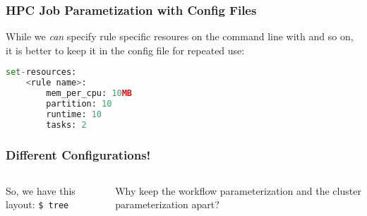 \begin{frame}[fragile]
  \frametitle{HPC Job Parametization with Config Files}
  While we \emph{can} specify rule specific resoures on the command line with  and so on, it is better to keep it in the config file for repeated use:
  \begin{lstlisting}[language=Python,style=Python]
set-resources:
    <rule name>:
        mem_per_cpu: 10MB
        partition: 10
        runtime: 10
        tasks: 2
  \end{lstlisting}
\end{frame}

\begin{frame}
  \frametitle{Different Configurations!}
  \begin{columns}
    \begin{column}{0.5\textwidth}
        So, we have this layout:
              {\tiny \DTsetlength{0.2em}{1em}{0.2em}{0.4pt}{.6pt}
\texttt{\$ tree}
}
    \end{column}
    \begin{column}{0.5\textwidth}
      \begin{question}
      	Why keep the workflow parameterization and the cluster parameterization apart?
      \end{question}
      \pause
    \end{column}
  \end{columns}
\end{frame}

